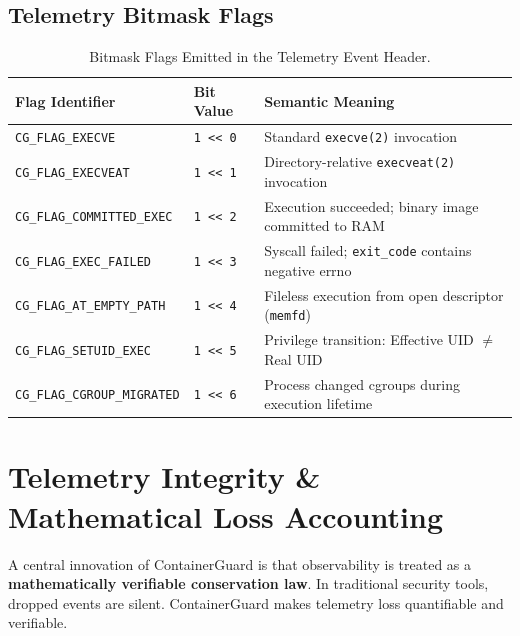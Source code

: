 \documentclass[11pt,a4paper]{article}
\begin{document}
\subsection{Telemetry Bitmask Flags}
\begin{table}[htbp]
\centering
\small
\begin{tabular}{llp{7.5cm}}
\toprule
\textbf{Flag Identifier} & \textbf{Bit Value} & \textbf{Semantic Meaning} \\
\midrule
\texttt{CG\_FLAG\_EXECVE} & \texttt{1 << 0} & Standard \texttt{execve(2)} invocation \\
\texttt{CG\_FLAG\_EXECVEAT} & \texttt{1 << 1} & Directory-relative \texttt{execveat(2)} invocation \\
\texttt{CG\_FLAG\_COMMITTED\_EXEC} & \texttt{1 << 2} & Execution succeeded; binary image committed to RAM \\
\texttt{CG\_FLAG\_EXEC\_FAILED} & \texttt{1 << 3} & Syscall failed; \texttt{exit\_code} contains negative errno \\
\texttt{CG\_FLAG\_AT\_EMPTY\_PATH} & \texttt{1 << 4} & Fileless execution from open descriptor (\texttt{memfd}) \\
\texttt{CG\_FLAG\_SETUID\_EXEC} & \texttt{1 << 5} & Privilege transition: Effective UID $\neq$ Real UID \\
\texttt{CG\_FLAG\_CGROUP\_MIGRATED} & \texttt{1 << 6} & Process changed cgroups during execution lifetime \\
\bottomrule
\end{tabular}
\caption{Bitmask Flags Emitted in the Telemetry Event Header.}
\label{tab:flags}
\end{table}

\newpage


\section{Telemetry Integrity \& Mathematical Loss Accounting}

A central innovation of ContainerGuard is that observability is treated as a \textbf{mathematically verifiable conservation law}. In traditional security tools, dropped events are silent. ContainerGuard makes telemetry loss quantifiable and verifiable.
\end{document}
